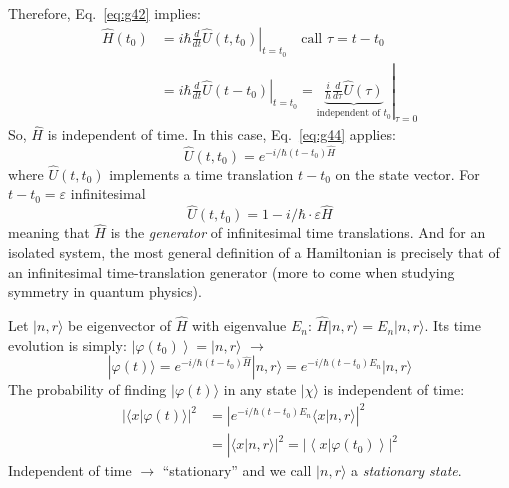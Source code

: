 \documentclass[12pt]{article}
\begin{document}
Therefore, Eq.~\eqref{eq:g42} implies:
\begin{equation}
\begin{aligned} 
\hat{H}\left(t_{0}\right) 
&=\left.i \hbar \frac{d}{d t} \hat{U}\left(t, t_{0}\right)\right|_{t=t_{0}}
\quad\textrm{call }\tau=t-t_{0} \\ 
&=\left.i \hbar \frac{d}{d t} \hat{U}\left(t-t_{0}\right)\right|_{t=t_{0}}
=\left.\underbrace{\frac{i}{h} \frac{d}{d \tau} \hat{U}(\tau)}_{\textrm{independent of }t_0}\right|_{\tau=0}
\end{aligned}
\end{equation}
So, $\hat{H}$ is independent of time.
In this case, Eq.~\eqref{eq:g44} applies:
\begin{equation}
\hat{U}\left(t, t_{0}\right)=e^{-i / \hbar\left(t-t_{0}\right) \hat{H}}
\end{equation}
where $\hat{U}\left(t, t_{0}\right)$ implements a time translation $t-t_0$
on the state vector.
For $t-t_0 = \varepsilon$ infinitesimal
\begin{equation}
\hat{U}\left(t, t_{0}\right)=1-i / \hbar \cdot \varepsilon \hat{H}
\end{equation}
meaning that $\hat{H}$ is the \emph{generator} of infinitesimal time translations.
And for an isolated system, the most
general definition of a Hamiltonian is
precisely that of an infinitesimal time-translation
generator (more to come when studying symmetry in quantum physics).


Let $|n,r\rangle$ be eigenvector of $\hat{H}$ with eigenvalue 
$E_n$: $\hat{H}|n, r\rangle=E_{n}|n, r\rangle$. Its time evolution
is simply: $\left.|\varphi(t_{0})\right\rangle=|n, r\rangle$ $\to$
\begin{equation}
|\varphi(t)\rangle=e^{-i / \hbar\left(t-t_{0}\right) \hat{H}}|n, r\rangle=e^{-i / \hbar\left(t-t_{0}\right) E_{n}}|n, r\rangle
\end{equation}
The probability of finding $|\varphi(t)\rangle$ in any
state $|\chi\rangle$ is independent of time:
\begin{equation}
\begin{aligned}|\langle x | \varphi(t)\rangle|^{2} &=\left|e^{-i / \hbar\left(t-t_{0}\right) E_{n}}\langle x | n, r\rangle\right|^{2} \\ &=\left|\left.\langle x | n, r\rangle\right|^{2}=\left|\left\langle x | \varphi\left(t_{0}\right)\right\rangle\right|^{2}\right.
\end{aligned}
\end{equation}
Independent of time $\to$ ``stationary'' and we call
$|n,r\rangle$ a \emph{stationary state}.
\end{document}
